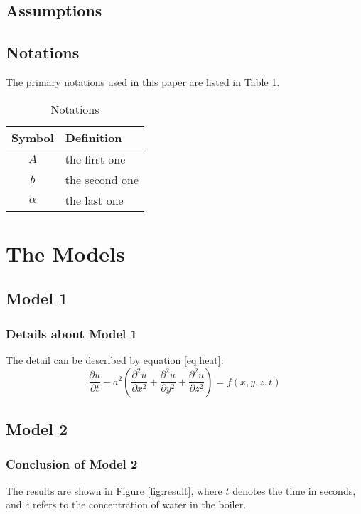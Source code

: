 \documentclass[12pt]{article}  %
\begin{document}
\subsection{Assumptions}

\subsection{Notations}
The primary notations used in this paper are listed in Table \ref{tb:notation}.


\begin{table}[!htbp]
\begin{center}
\caption{Notations}
\begin{tabular}{cl}
	\toprule
	\multicolumn{1}{m{3cm}}{\centering Symbol}
	&\multicolumn{1}{m{8cm}}{\centering Definition}\\
	\midrule
	$A$&the first one\\
	$b$&the second one\\
	$\alpha$ &the last one\\
	\bottomrule
\end{tabular}\label{tb:notation}
\end{center}
\end{table}

\section{The Models}
\subsection{Model 1}
\subsubsection{Details about Model 1}
The detail can be described by equation \eqref{eq:heat}:
\begin{equation}\label{eq:heat}
\frac{\partial u}{\partial t} - a^2 \left( \frac{\partial^2 u}{\partial x^2} + \frac{\partial^2 u}{\partial y^2} + \frac{\partial^2 u}{\partial z^2} \right) = f(x, y, z, t)
\end{equation}

\subsection{Model 2}
\subsubsection{Conclusion of Model 2}
The results are shown in Figure \ref{fig:result}, where $t$ denotes the time in seconds, and $c$ refers to the concentration of water in the boiler.
\end{document}
